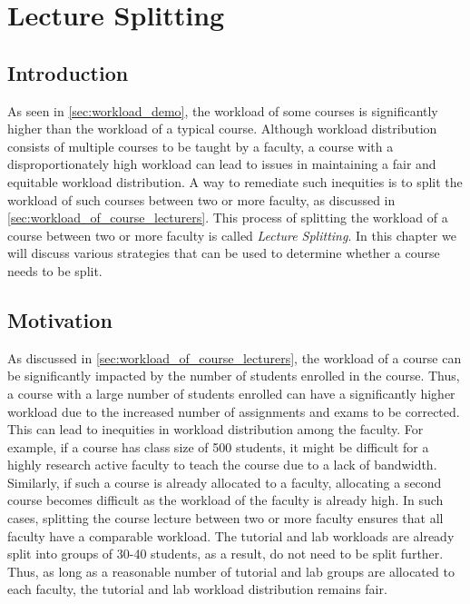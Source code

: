 \chapter{Lecture Splitting}

\section{Introduction}

As seen in \autoref{sec:workload_demo}, the workload of some courses is significantly higher than the workload of a typical course. Although workload distribution consists of multiple courses to be taught by a faculty, a course with a disproportionately high workload can lead to issues in maintaining a fair and equitable workload distribution. A way to remediate such inequities is to split the workload of such courses between two or more faculty, as discussed in \autoref{sec:workload_of_course_lecturers}. This process of splitting the workload of a course between two or more faculty is called \textit{Lecture Splitting}. In this chapter we will discuss various strategies that can be used to determine whether a course needs to be split.

\section{Motivation}

As discussed in \autoref{sec:workload_of_course_lecturers}, the workload of a course can be significantly impacted by the number of students enrolled in the course. Thus, a course with a large number of students enrolled can have a significantly higher workload due to the increased number of assignments and exams to be corrected. This can lead to inequities in workload distribution among the faculty. For example, if a course has class size of 500 students, it might be difficult for a highly research active faculty to teach the course due to a lack of bandwidth. Similarly, if such a course is already allocated to a faculty, allocating a second course becomes difficult as the workload of the faculty is already high. In such cases, splitting the course lecture between two or more faculty ensures that all faculty have a comparable workload. The tutorial and lab workloads are already split into groups of 30-40 students, as a result, do not need to be split further. Thus, as long as a reasonable number of tutorial and lab groups are allocated to each faculty, the tutorial and lab workload distribution remains fair.

